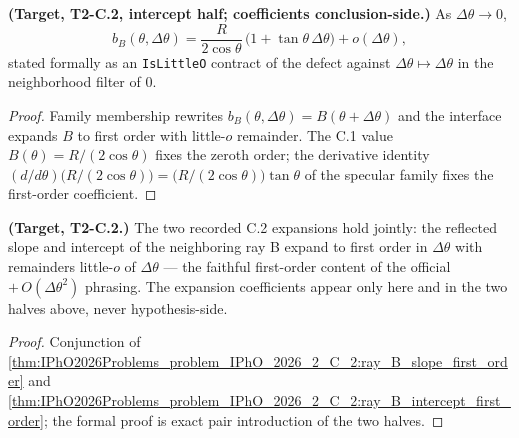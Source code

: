 \begin{theorem}
\label{thm:IPhO2026Problems_problem_IPhO_2026_2_C_2:ray_B_intercept_first_order}
\textbf{(Target, T2-C.2, intercept half; coefficients conclusion-side.)}
As $\Delta\theta \to 0$,
\[
b_B(\theta, \Delta\theta)
= \frac{R}{2\cos\theta}\,\bigl(1 + \tan\theta\,\Delta\theta\bigr)
+ o(\Delta\theta) ,
\]
stated formally as an \texttt{IsLittleO} contract of the defect against
$\Delta\theta \mapsto \Delta\theta$ in the neighborhood filter of $0$.
\end{theorem}
\begin{proof}
Family membership rewrites $b_B(\theta,\Delta\theta) = B(\theta+\Delta\theta)$
and the interface expands $B$ to first order with little-$o$ remainder.
The C.1 value $B(\theta) = R/(2\cos\theta)$ fixes the zeroth order; the
derivative identity
$(d/d\theta)\bigl(R/(2\cos\theta)\bigr)
= \bigl(R/(2\cos\theta)\bigr)\tan\theta$ of the specular family fixes the
first-order coefficient.
\end{proof}

\begin{theorem}
\label{thm:IPhO2026Problems_problem_IPhO_2026_2_C_2:ray_B_first_order_expansion}
\textbf{(Target, T2-C.2.)}  The two recorded C.2 expansions hold jointly:
the reflected slope and intercept of the neighboring ray B expand to first
order in $\Delta\theta$ with remainders little-$o$ of $\Delta\theta$ ---
the faithful first-order content of the official $+\,O(\Delta\theta^{2})$
phrasing.  The expansion coefficients appear only here and in the two halves
above, never hypothesis-side.
\end{theorem}
\begin{proof}
Conjunction of
\cref{thm:IPhO2026Problems_problem_IPhO_2026_2_C_2:ray_B_slope_first_order}
and
\cref{thm:IPhO2026Problems_problem_IPhO_2026_2_C_2:ray_B_intercept_first_order};
the formal proof is exact pair introduction of the two halves.
\end{proof}

